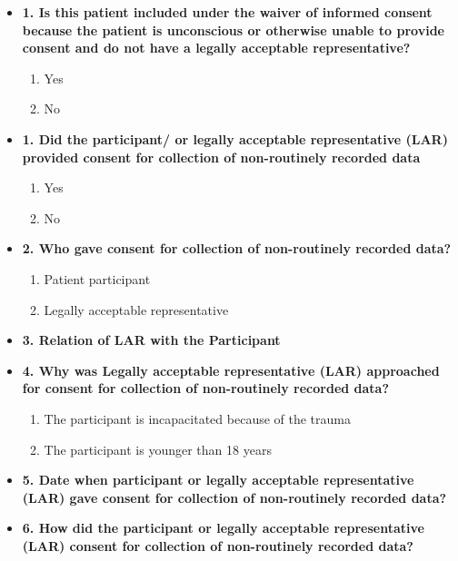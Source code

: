 \documentclass[
]{scrartcl}
\providecommand{\tightlist}{%
  \setlength{\itemsep}{0pt}\setlength{\parskip}{0pt}}\usepackage{longtable,booktabs,array}
\begin{document}
\begin{itemize}
\item
  \textbf{1. Is this patient included under the waiver of informed
  consent because the patient is unconscious or otherwise unable to
  provide consent and do not have a legally acceptable representative?}

  \begin{enumerate}
  \def\labelenumi{\arabic{enumi}.}
  \tightlist
  \item
    Yes
  \item
    No
  \end{enumerate}
\item
  \textbf{1. Did the participant/ or legally acceptable representative
  (LAR) provided consent for collection of non-routinely recorded data}

  \begin{enumerate}
  \def\labelenumi{\arabic{enumi}.}
  \tightlist
  \item
    Yes
  \item
    No
  \end{enumerate}
\item
  \textbf{2. Who gave consent for collection of non-routinely recorded
  data?}

  \begin{enumerate}
  \def\labelenumi{\arabic{enumi}.}
  \tightlist
  \item
    Patient participant
  \item
    Legally acceptable representative
  \end{enumerate}
\item
  \textbf{3. Relation of LAR with the Participant}
\item
  \textbf{4. Why was Legally acceptable representative (LAR) approached
  for consent for collection of non-routinely recorded data?}

  \begin{enumerate}
  \def\labelenumi{\arabic{enumi}.}
  \tightlist
  \item
    The participant is incapacitated because of the trauma
  \item
    The participant is younger than 18 years
  \end{enumerate}
\item
  \textbf{5. Date when participant or legally acceptable representative
  (LAR) gave consent for collection of non-routinely recorded data?}
\item
  \textbf{6. How did the participant or legally acceptable
  representative (LAR) consent for collection of non-routinely recorded
  data?}


\end{itemize}
\end{document}
